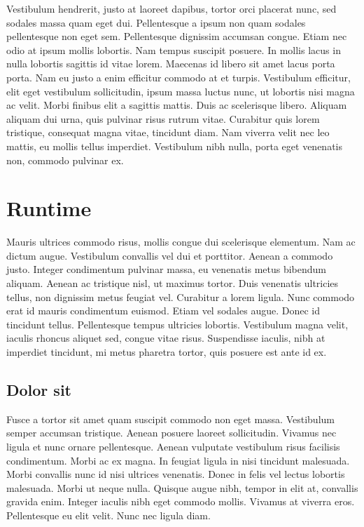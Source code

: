 Vestibulum hendrerit, justo at laoreet dapibus, tortor orci placerat nunc, sed sodales massa quam eget dui. Pellentesque a ipsum non quam sodales pellentesque non eget sem. Pellentesque dignissim accumsan congue. Etiam nec odio at ipsum mollis lobortis. Nam tempus suscipit posuere. In mollis lacus in nulla lobortis sagittis id vitae lorem. Maecenas id libero sit amet lacus porta porta. Nam eu justo a enim efficitur commodo at et turpis. Vestibulum efficitur, elit eget vestibulum sollicitudin, ipsum massa luctus nunc, ut lobortis nisi magna ac velit. Morbi finibus elit a sagittis mattis. Duis ac scelerisque libero. Aliquam aliquam dui urna, quis pulvinar risus rutrum vitae. Curabitur quis lorem tristique, consequat magna vitae, tincidunt diam. Nam viverra velit nec leo mattis, eu mollis tellus imperdiet. Vestibulum nibh nulla, porta eget venenatis non, commodo pulvinar ex.

\section{Runtime}
\label{sec:ipsum}
Mauris ultrices commodo risus, mollis congue dui scelerisque elementum. Nam ac dictum augue. Vestibulum convallis vel dui et porttitor. Aenean a commodo justo. Integer condimentum pulvinar massa, eu venenatis metus bibendum aliquam. Aenean ac tristique nisl, ut maximus tortor. Duis venenatis ultricies tellus, non dignissim metus feugiat vel. Curabitur a lorem ligula. Nunc commodo erat id mauris condimentum euismod. Etiam vel sodales augue. Donec id tincidunt tellus. Pellentesque tempus ultricies lobortis. Vestibulum magna velit, iaculis rhoncus aliquet sed, congue vitae risus. Suspendisse iaculis, nibh at imperdiet tincidunt, mi metus pharetra tortor, quis posuere est ante id ex.

\subsection{Dolor sit} %
\label{sub:dolor_sit}
Fusce a tortor sit amet quam suscipit commodo non eget massa. Vestibulum semper accumsan tristique. Aenean posuere laoreet sollicitudin. Vivamus nec ligula et nunc ornare pellentesque. Aenean vulputate vestibulum risus facilisis condimentum. Morbi ac ex magna. In feugiat ligula in nisi tincidunt malesuada. Morbi convallis nunc id nisi ultrices venenatis. Donec in felis vel lectus lobortis malesuada. Morbi ut neque nulla. Quisque augue nibh, tempor in elit at, convallis gravida enim. Integer iaculis nibh eget commodo mollis. Vivamus at viverra eros. Pellentesque eu elit velit. Nunc nec ligula diam.

